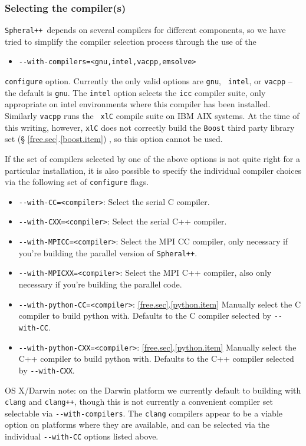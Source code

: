 \documentclass{article}
\newcommand{\Spheral}{{\tt Spheral++}}
\begin{document}
\subsubsection{Selecting the compiler(s)}
\Spheral\ depends on several compilers for different components, so we have
tried to simplify the compiler selection process through the use of the
\begin{itemize}
\item \verb+--with-compilers=<gnu,intel,vacpp,emsolve>+
\end{itemize}
{\tt configure} option.  Currently the only valid options are {\tt gnu}, {\tt
  intel}, or {\tt vacpp} -- the default is {\tt gnu}.  The {\tt intel} option
selects the {\tt icc} compiler suite, only appropriate on intel environments
where this compiler has been installed.  Similarly {\tt vacpp} runs the {\tt
  xlC} compile suite on IBM AIX systems.  At the time of this writing, however,
{\tt xlC} does not correctly build the {\tt Boost} third party library set (\S
\ref{free.sec}.\ref{boost.item}) , so this option cannot be used.

If the set of compilers selected by one of the above options is not quite right
for a particular installation, it is also possible to specify the individual
compiler choices via the following set of {\tt configure} flags.
\begin{itemize}
\item \verb+--with-CC=<compiler>+: Select the serial C compiler.
\item \verb+--with-CXX=<compiler>+: Select the serial C++ compiler.
\item \verb+--with-MPICC=<compiler>+: Select the MPI CC compiler, only necessary
if you're building the parallel version of \Spheral.
\item \verb+--with-MPICXX=<compiler>+: Select the MPI C++ compiler, also only
necessary if you're building the parallel code.
\item \verb+--with-python-CC=<compiler>+: \ref{free.sec}.\ref{python.item}
 Manually select the C compiler to build python with.  Defaults to the
 C compiler selected by \verb+--with-CC+.
\item \verb+--with-python-CXX=<compiler>+: \ref{free.sec}.\ref{python.item}
Manually select the C++ compiler to build python with.  Defaults to
the C++ compiler selected by \verb+--with-CXX+.
\end{itemize}

OS X/Darwin note: on the Darwin platform we currently default to building with
{\tt clang} and {\tt clang++}, though this is not currently a convenient
compiler set selectable via \verb.--with-compilers..  The {\tt clang} compilers
appear to be a viable option on platforms where they are available, and can be
selected via the individual \verb.--with-CC. options listed above.
\end{document}
